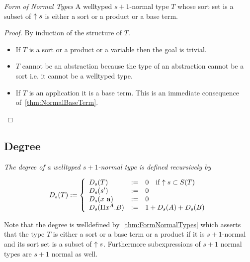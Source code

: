 


\begin{theorem}
    \label{thm:FormNormalTypes}
    \emph{Form of Normal Types} A welltyped $s+1$-normal type $T$ whose sort set
    is a subset of ${\uparrow s}$ is either a sort or a product or a base
    term.


    \begin{proof}
        By induction of the structure of $T$.
        \begin{itemize}

            \item If $T$ is a sort or a product or a variable then the goal is
                trivial.

            \item $T$ cannot be an abstraction because the type of an
                abstraction cannot be a sort i.e. it cannot be a welltyped type.

            \item If $T$ is an application it is a base term. This is an
                immediate consequence of~\ref{thm:NormalBaseTerm}.
        \end{itemize}
    \end{proof}
\end{theorem}



\subsection{Degree}

\begin{definition}
    \label{def:TypeDegree}
    \emph{The degree of a welltyped $s+1$-normal type is defined recursively by}

    $$
    D_s(T) :=
    \dcases{
        D_s(T) &:=& 0 \quad\text{if } \upper s \subset S(T)
        \\
        D_s(s') &:=& 0
        \\
        D_s(x \vec a) &:=& 0
        \\
        D_s(\Pi x^A.B) &:=&
        1 + D_s(A) +  D_s(B)
    }
    $$

    Note that the degree is welldefined by~\ref{thm:FormNormalTypes} which
    asserts that the type $T$ is either a sort or a base term or a product if it
    is $s+1$-normal and
    its sort set is a subset of ${\uparrow s}$.
    Furthermore subexpressions of $s+1$ normal types are $s+1$ normal as well.
\end{definition}



